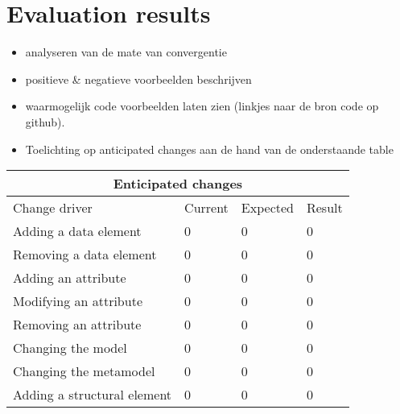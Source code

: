 \chapter{Evaluation results} \label{evaluation}

\begin{itemize}
    \item analyseren van de mate van convergentie
    \item positieve \& negatieve voorbeelden beschrijven
    \item waarmogelijk code voorbeelden laten zien (linkjes naar de bron code op github).
    \item Toelichting op anticipated changes aan de hand van de onderstaande table
\end{itemize}

\begin{tabular}{ |p{5cm}||p{2cm}|p{2cm}|p{2cm}|  }
    \hline
    \multicolumn{4}{|c|}{Enticipated changes} \\
    \hline
    Change driver &Current &Expected &Result\\
    \hline
    Adding a data element &0 &0 &0\\
    Removing a data element &0 &0 &0\\
    Adding an attribute &0 &0 &0\\
    Modifying an attribute &0 &0 &0\\
    Removing an attribute    &0 &0 &0\\
    Changing the model &0 &0 &0\\
    Changing the metamodel &0 &0 &0\\
    Adding a structural element &0 &0 &0\\
    \hline
   \end{tabular}
